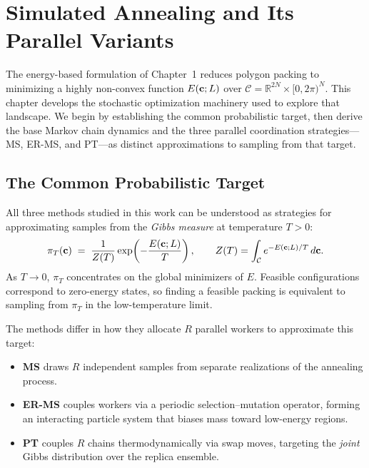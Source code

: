 \chapter{Simulated Annealing and Its Parallel Variants}

The energy-based formulation of Chapter~1 reduces polygon packing to
minimizing a highly non-convex function $E(\mathbf{c}; L)$ over
$\mathcal{C} = \mathbb{R}^{2N} \times [0, 2\pi)^N$.
This chapter develops the stochastic optimization machinery used
to explore that landscape.
We begin by establishing the common probabilistic target, then
derive the base Markov chain dynamics and the three parallel coordination
strategies---MS, ER-MS, and PT---as distinct approximations to sampling
from that target.

\section{The Common Probabilistic Target}

All three methods studied in this work can be understood as strategies for
approximating samples from the \emph{Gibbs measure} at temperature $T > 0$:
\[
  \pi_T(\mathbf{c}) \;=\; \frac{1}{Z(T)}\exp\!\left(-\frac{E(\mathbf{c};L)}{T}\right),
  \qquad
  Z(T) = \int_{\mathcal{C}} e^{-E(\mathbf{c};L)/T}\,d\mathbf{c}.
\]
As $T \to 0$, $\pi_T$ concentrates on the global minimizers of $E$.
Feasible configurations correspond to zero-energy states, so finding a
feasible packing is equivalent to sampling from $\pi_T$ in the low-temperature
limit.

The methods differ in how they allocate $R$ parallel workers to approximate
this target:
\begin{itemize}
  \item \textbf{MS} draws $R$ independent samples from separate realizations
        of the annealing process.
  \item \textbf{ER-MS} couples workers via a periodic selection--mutation
        operator, forming an interacting particle system that biases mass
        toward low-energy regions.
  \item \textbf{PT} couples $R$ chains thermodynamically via swap moves,
        targeting the \emph{joint} Gibbs distribution over the replica ensemble.
\end{itemize}

